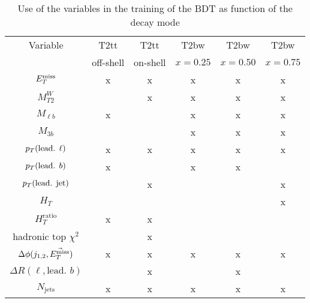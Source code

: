             \begin{table}[h!]
                \begin{center}
                    \begin{tabular}{|c|cc|ccc|}
                        
                        \hline
                        Variable                            & T2tt      & T2tt      & T2bw      & T2bw      & T2bw      \\
                                                            & off-shell & on-shell  & $x=0.25$  & $x=0.50$  & $x=0.75$  \\
                        \hline
                        $E_T^\text{miss}$                               &     x     &     x     &     x     &     x     &     x     \\ 
                        $M_{T2}^W$                          &           &     x     &     x     &     x     &     x     \\
                        $M_{\ell b}$                        &     x     &           &     x     &     x     &     x     \\
                        $M_{3 b}$                           &           &           &     x     &     x     &     x     \\
                        $p_T(\text{lead. } \ell)$           &     x     &     x     &     x     &     x     &     x     \\   
                        $p_T(\text{lead. } b)$              &     x     &           &     x     &     x     &           \\
                        $p_T(\text{lead. jet})$             &           &     x     &           &           &     x     \\
                        $H_{T}$                             &           &           &           &           &     x     \\
                        $H_{T}^\text{ratio}$                &     x     &     x     &           &           &           \\   
                        hadronic top $\chi^2$               &           &     x     &           &           &           \\
                        $\Delta\phi(j_{1,2},\vec{E_T^\text{miss}})$     &     x     &     x     &     x     &     x     &     x     \\
                        $\Delta R( \ell, \text{lead. } b)$  &           &     x     &           &     x     &           \\
                        $N_\text{jets}$                     &     x     &     x     &     x     &     x     &     x     \\
                        \hline
                    \end{tabular}
                    \caption{Use of the variables in the training of the BDT as function of the decay mode}
                    \label{tab:BDTVariableUsage}
                \end{center}
            \end{table}

